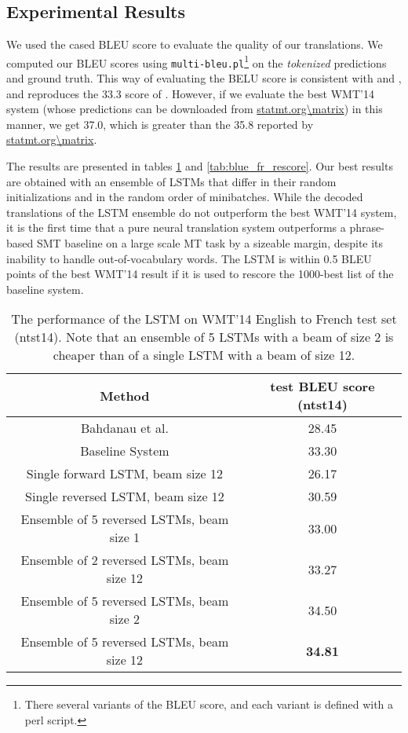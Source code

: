\documentclass{article} \usepackage{nips14submit_e}
\begin{document}
\subsection{Experimental Results}

We used the cased BLEU score \cite{bleu} to evaluate the quality of our
translations. We computed our BLEU scores using \texttt{multi-bleu.pl}\footnote{
There several variants of the BLEU score, and each variant is defined  with a perl script. } 
on the \emph{tokenized} predictions and ground truth.
This way of evaluating the BELU score is consistent with \cite{cho14} and \cite{bog14}, and reproduces
the 33.3 score of \cite{wmt14_en_fr}.
However, if we evaluate the best WMT'14 system \cite{durrani-EtAl:2014:W14-33}
(whose predictions can be downloaded from \url{statmt.org\matrix}) in this manner, we get   
37.0, which is greater than the 35.8 reported by \url{statmt.org\matrix}.  







The results are presented in tables \ref{tab:blue_fr} and
\ref{tab:blue_fr_rescore}.  Our best results are obtained with an
ensemble of LSTMs that differ in their random initializations and
in the random order of minibatches.  While the decoded translations of the
LSTM ensemble do not outperform the best WMT'14 system, it is the first time
that a pure neural translation system outperforms a 
phrase-based SMT baseline on a large scale MT task by a sizeable margin,
despite its inability to handle out-of-vocabulary words.  The LSTM
is within 0.5 BLEU points of the best WMT'14 result if it is used to rescore the 1000-best
list of the baseline system.

\begin{table}[t]
\centering
\begin{small}
\begin{tabular}{|c|c|}
\hline
{\bf Method}  & {\bf test BLEU score (ntst14) } \\ \hline
Bahdanau et al. \cite{bog14}  &  28.45 \\ \hline
Baseline System  \cite{wmt14_en_fr} & 33.30 \\ \hline
\hline
Single forward LSTM, beam size 12 & 26.17 \\ \hline                 
Single reversed LSTM, beam size 12 & 30.59 \\ \hline
Ensemble of 5 reversed LSTMs, beam size 1  &  33.00 \\ \hline
Ensemble of 2 reversed LSTMs, beam size 12  &  33.27 \\ \hline
Ensemble of 5 reversed LSTMs, beam size 2  &  34.50 \\ \hline
Ensemble of 5 reversed LSTMs, beam size 12  &  {\bf 34.81} \\ \hline
\end{tabular}
\end{small}
\caption{The performance of the LSTM on WMT'14 English to French test
  set (ntst14).  Note that an ensemble of 5 LSTMs with a beam of size
  2 is cheaper than of a single LSTM with a beam of size 12.  }
\label{tab:blue_fr}
\end{table}
\end{document}

